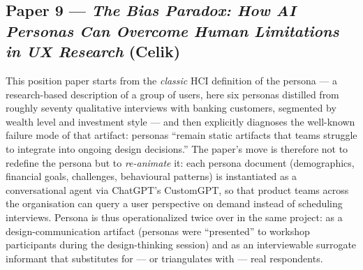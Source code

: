 
\subsection*{Paper 9 --- \textit{The Bias Paradox: How AI Personas Can Overcome Human Limitations in UX Research} (Celik)}

This position paper starts from the \emph{classic} HCI definition of the persona --- a research-based description of a group of users, here six personas distilled from roughly seventy qualitative interviews with banking customers, segmented by wealth level and investment style --- and then explicitly diagnoses the well-known failure mode of that artifact: personas ``remain static artifacts that teams struggle to integrate into ongoing design decisions.'' The paper's move is therefore not to redefine the persona but to \emph{re-animate} it: each persona document (demographics, financial goals, challenges, behavioural patterns) is instantiated as a conversational agent via ChatGPT's CustomGPT, so that product teams across the organisation can query a user perspective on demand instead of scheduling interviews. Persona is thus operationalized twice over in the same project: as a design-communication artifact (personas were ``presented'' to workshop participants during the design-thinking session) and as an interviewable surrogate informant that substitutes for --- or triangulates with --- real respondents.

